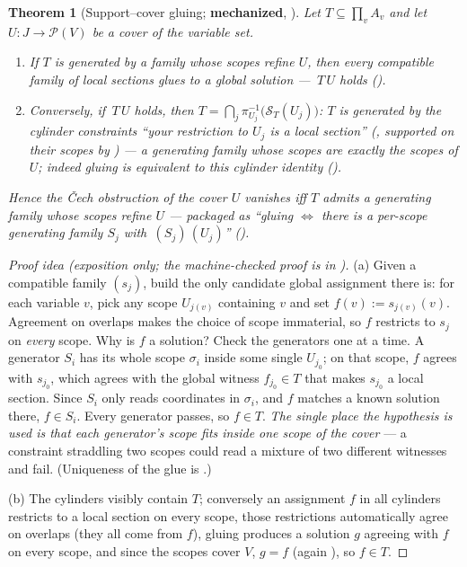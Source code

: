 \documentclass[11pt]{article}
\newtheorem{theorem}{Theorem}
\newcommand{\Sec}{\mathcal S}
\begin{document}
\begin{theorem}[Support--cover gluing; \textbf{mechanized},
]
\label{thm:supportcover}
Let $T \subseteq \prod_v A_v$ and let $U : J \to \mathcal P(V)$ be a
cover of the variable set.
\begin{enumerate}
\item[(a)] If $T$ is generated by a family whose scopes refine $U$,
  then every compatible family of local sections glues to a global
  solution --- $\,T\,U$ holds
  ().
\item[(b)] Conversely, if $\,T\,U$ holds,
  then $T = \bigcap_{j} \pi_{U_j}^{-1}\!\bigl(\Sec_T(U_j)\bigr)$: $T$
  is generated by the \emph{cylinder} constraints ``your restriction
  to $U_j$ is a local section'' (, supported on
  their scopes by ) --- a generating
  family whose scopes are exactly the scopes of $U$; indeed gluing is
  \emph{equivalent} to this cylinder identity
  ().
\end{enumerate}
Hence the \v{C}ech obstruction of the cover $U$ vanishes \emph{iff}
$T$ admits a generating family whose scopes refine $U$ --- packaged
as ``gluing $\iff$ there is a per-scope generating family $S_j$ with
$\,(S_j)\,(U_j)$''
().
\end{theorem}

\begin{proof}[Proof idea (exposition only; the machine-checked proof
is in )]
(a) Given a compatible family $(s_j)$, build the only candidate
global assignment there is: for each variable $v$, pick any scope
$U_{j(v)}$ containing $v$ and set $f(v) := s_{j(v)}(v)$.  Agreement
on overlaps makes the choice of scope immaterial, so $f$ restricts to
$s_j$ on \emph{every} scope.  Why is $f$ a solution?  Check the
generators one at a time.  A generator $S_i$ has its whole scope
$\sigma_i$ inside some single $U_{j_0}$; on that scope, $f$ agrees
with $s_{j_0}$, which agrees with the global witness $f_{j_0} \in T$
that makes $s_{j_0}$ a local section.  Since $S_i$ only reads
coordinates in $\sigma_i$, and $f$ matches a known solution there,
$f \in S_i$.  Every generator passes, so $f \in T$.  \emph{The single
place the hypothesis is used is that each generator's scope fits
inside one scope of the cover} --- a constraint straddling two scopes
could read a mixture of two different witnesses and fail.
(Uniqueness of the glue is .)

(b) The cylinders visibly contain $T$; conversely an assignment $f$
in all cylinders restricts to a local section on every scope, those
restrictions automatically agree on overlaps (they all come from
$f$), gluing produces a solution $g$ agreeing with $f$ on every
scope, and since the scopes cover $V$, $g = f$ (again
), so $f \in T$.
\end{proof}
\end{document}
